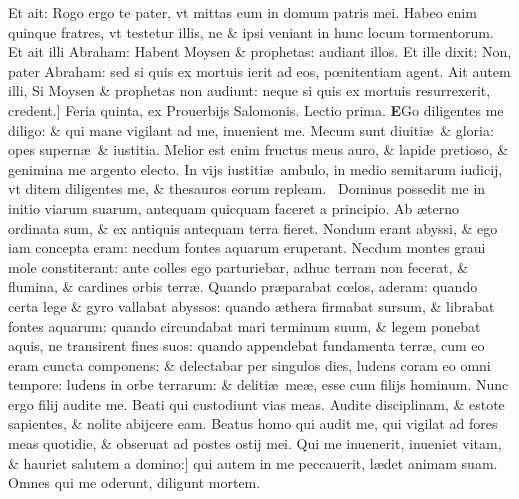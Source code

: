 \documentclass[a5paper,10pt]{book}
\def\leftmarginnote{%
	\lrmarginnote{\hskip -\marginparsep \hskip -6.5em}}
\def\rightmarginnote{%
	\lrmarginnote{\hskip\columnwidth \hskip -1em}}
\def\ae{æ}
\def\oe{œ}
\begin{document}
\begin{multicols*}{2}
Et ait: Rogo ergo te pater, vt mittas eum in domum patris mei.
Habeo enim quinque fratres, vt testetur illis, ne \& ipsi veniant in hunc locum tormentorum. Et ait illi Abraham: Habent Moysen \& prophetas: audiant illos.
Et ille dixit: Non, pater Abraham: sed si quis ex mortuis ierit ad eos, p\oe nitentiam agent.
Ait autem illi, Si Moysen \& prophetas non audiunt: neque si quis ex mortuis resurrexerit, credent.]
\newline {} \color{red} \hypertarget{THU-SECVNDA-POST-ADV}{Feria quinta,} ex Prouerbijs Salomonis. \hfill Lectio prima. \color{black}
\vspace{-2.25em}
\lettrine[lines=2]{\bfseries E}{}Go\rightmarginnote{ca. 8.} diligentes me diligo: \& qui mane vigilant ad me, inuenient me.
Mecum sunt diuiti\ae \ \& gloria: opes supern\ae \ \& iustitia. Melior est enim fructus meus auro, \& lapide pretioso, \& genimina me argento electo.
In vijs iustiti\ae \ ambulo, in medio semitarum iudicij, vt ditem diligentes me, \& thesauros eorum repleam. \textdagger \ 
Dominus\rightmarginnote{B} possedit me in initio viarum suarum, antequam quicquam faceret a principio.
Ab \ae terno ordinata sum, \& ex antiquis antequam terra fieret. Nondum erant abyssi, \& ego iam concepta eram: necdum fontes aquarum eruperant.
Necdum montes graui mole constiterant: ante colles ego parturiebar, adhuc terram non fecerat, \& flumina, \& cardines orbis terr\ae .
Quando\leftmarginnote{\begin{flushright}B\end{flushright}} pr\ae parabat c\oe los, aderam: quando certa lege \& gyro vallabat abyssos: quando \ae thera firmabat sursum, \& librabat fontes aquarum: quando circundabat mari terminum suum, \& legem ponebat aquis, ne transirent fines suos: quando appendebat fundamenta terr\ae , cum eo eram
cuncta componens: \& delectabar per singulos dies, ludens coram eo omni tempore: ludens in orbe terrarum: \& deliti\ae \ me\ae , esse cum filijs hominum.
Nunc ergo filij audite me. Beati qui custodiunt vias meas. Audite disciplinam, \& estote sapientes, \& nolite abijcere eam.
Beatus homo qui audit me, qui vigilat ad fores meas quotidie, \& obseruat ad postes ostij mei.
Qui me inuenerit, inueniet vitam, \& hauriet salutem a domino:] qui\leftmarginnote{\begin{flushright}C\end{flushright}} autem in me peccauerit, l\ae det animam suam.
Omnes qui me oderunt, diligunt mortem.
\fancyhead[C]{\color{red} Feria. v. Dominic\ae . ij. post aduentum}

\end{multicols*}
\end{document}
